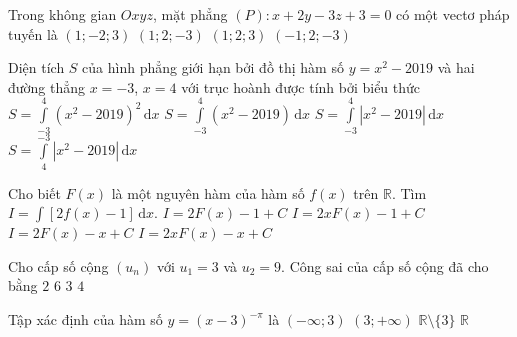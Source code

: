 \begin{ex} %
	Trong không gian $Oxyz$, mặt phẳng $(P)\colon x+2y-3z+3=0$ có một vectơ pháp tuyến là
	\choice
	{$(1;-2;3)$}
	{\True $(1;2;-3)$}
	{$(1;2;3)$}
	{$(-1;2;-3)$}
\end{ex}

\begin{ex} %
	Diện tích $S$ của hình phẳng giới hạn bởi đồ thị hàm số $y=x^2-2019$ và hai đường thẳng $x=-3$, $x=4$ với trục hoành được tính bởi biểu thức
	\choice
	{$S=\displaystyle\int \limits_{-3}^{4}(x^2-2019)^2\mathrm{\,d}x$}
	{$S=\displaystyle\int \limits_{-3}^{4}(x^2-2019)\mathrm{\,d}x$}
	{\True $S=\displaystyle\int \limits_{-3}^{4}\left|x^2-2019\right|\mathrm{\,d}x$}
	{$S=\displaystyle\int \limits_{4}^{-3}\left|x^2-2019\right|\mathrm{\,d}x$}
\end{ex}

\begin{ex} %
	Cho biết $F(x)$ là một nguyên hàm của hàm số $f(x)$ trên $\mathbb{R}$. Tìm $I=\displaystyle\int \limits[2f(x)-1]\mathrm{\,d}x$.
	\choice
	{$I=2F(x)-1+C$}
	{$I=2xF(x)-1+C$}
	{\True $I=2F(x)-x+C$}
	{$I=2xF(x)-x+C$}
\end{ex}

\begin{ex} %
	Cho cấp số cộng $(u_n)$ với $u_1=3$ và $u_2=9$. Công sai của cấp số cộng đã cho bằng
	\choice
	{$2$}
	{\True $6$}
	{$3$}
	{$4$}
\end{ex}

\begin{ex} %
	Tập xác định của hàm số $y=(x-3)^{-\pi}$ là
	\choice
	{$(-\infty;3)$}
	{\True $(3;+\infty)$}
	{$\mathbb{R}\setminus\{3\}$}
	{$\mathbb{R}$}
\end{ex}

